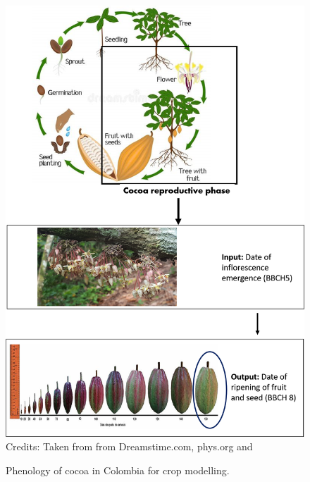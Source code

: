 \documentclass[gene,journal,article,submit,moreauthors,pdftex]{Definitions/mdpi}
\begin{document}
 
\begin{figure}[h!]
	\centering
	\caption{\footnotesize {Phenology of cocoa in Colombia for crop modelling.\\}} 
	\includegraphics[scale=0.4]{images/phenology.png}\\
	\footnotesize{Credits: Taken from from Dreamstime.com, phys.org \citep{toledo2021} and \cite{lopez2018}}
	\label{fig:pheno}
\end{figure}
\end{document}
